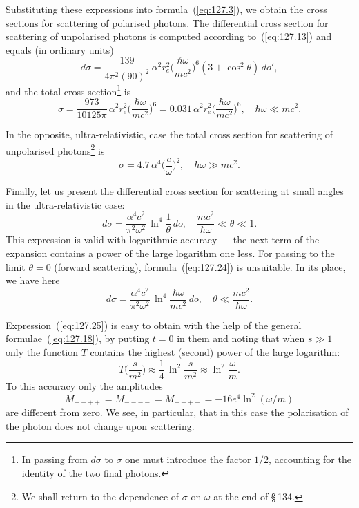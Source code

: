 
Substituting these expressions into formula~(\ref{eq:127.3}), we obtain the cross sections for scattering of polarised photons. The differential cross section for scattering of unpolarised photons is computed according to~(\ref{eq:127.13}) and equals (in ordinary units)
\begin{equation}
d\sigma = \frac{139}{4\pi^2(90)^2}\,\alpha^2 r_e^2\biggl(\frac{\hbar\omega}{mc^2}\biggr)^{\!6}(3 + \cos^2\theta)\,do',
\label{eq:127.21}
\end{equation}
and the total cross section\footnote{In passing from $d\sigma$ to $\sigma$ one must introduce the factor $1/2$, accounting for the identity of the two final photons.} is
\begin{equation}
\sigma = \frac{973}{10125\pi}\,\alpha^2 r_e^2\biggl(\frac{\hbar\omega}{mc^2}\biggr)^{\!6} = 0{.}031\,\alpha^2 r_e^2\biggl(\frac{\hbar\omega}{mc^2}\biggr)^{\!6}, \quad \hbar\omega \ll mc^2.
\label{eq:127.22}
\end{equation}

In the opposite, ultra-relativistic, case the total cross section for scattering of unpolarised photons\footnote{We shall return to the dependence of $\sigma$ on $\omega$ at the end of \S\,134.} is
\begin{equation}
\sigma = 4{.}7\,\alpha^4\biggl(\frac{c}{\omega}\biggr)^{\!2}, \quad \hbar\omega \gg mc^2.
\label{eq:127.23}
\end{equation}

Finally, let us present the differential cross section for scattering at small angles in the ultra-relativistic case:
\begin{equation}
d\sigma = \frac{\alpha^4 c^2}{\pi^2\omega^2}\,\ln^4\frac{1}{\theta}\,do, \quad \frac{mc^2}{\hbar\omega} \ll \theta \ll 1.
\label{eq:127.24}
\end{equation}
This expression is valid with logarithmic accuracy --- the next term of the expansion contains a power of the large logarithm one less. For passing to the limit $\theta = 0$ (forward scattering), formula~(\ref{eq:127.24}) is unsuitable. In its place, we have here
\begin{equation}
d\sigma = \frac{\alpha^4 c^2}{\pi^2\omega^2}\,\ln^4\frac{\hbar\omega}{mc^2}\,do, \quad \theta \ll \frac{mc^2}{\hbar\omega}.
\label{eq:127.25}
\end{equation}

Expression~(\ref{eq:127.25}) is easy to obtain with the help of the general formulae~(\ref{eq:127.18}), by putting $t = 0$ in them and noting that when $s \gg 1$ only the function $T$ contains the highest (second) power of the large logarithm:
\[
T\biggl(\frac{s}{m^2}\biggr) \approx \frac{1}{4}\,\ln^2\frac{s}{m^2} \approx \ln^2\frac{\omega}{m}.
\]
To this accuracy only the amplitudes
\[
M_{++++} = M_{----} = M_{+-+-} = -16e^4\ln^2(\omega/m)
\]
are different from zero. We see, in particular, that in this case the polarisation of the photon does not change upon scattering.

